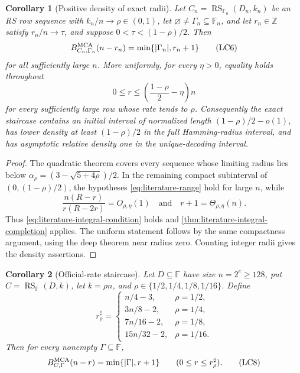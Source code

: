 \documentclass[11pt,a4paper]{amsart}
\numberwithin{equation}{section}
\newtheorem{corollary}[corollary]{Corollary}
\theoremstyle{remark}
\DeclareMathOperator{\RS}{RS}
\newcommand{\F}{\mathbb F}
\newcommand{\Z}{\mathbb Z}
\newcommand{\abs}[1]{\lvert #1\rvert}
\begin{document}
\begin{corollary}[Positive density of exact radii]
\label{cor:positive-radius-density}
Let \(C_n=\RS_{\F_n}(D_n,k_n)\) be an RS row sequence with
\(k_n/n\to\rho\in(0,1)\), let
\(\varnothing\ne\Gamma_n\subseteq\F_n\), and let \(r_n\in\Z\) satisfy
\(r_n/n\to\tau\), and suppose
\(0<\tau<(1-\rho)/2\).  Then
\[
 B_{C_n,\Gamma_n}^{\rm MCA}(n-r_n)
 =\min\{\abs{\Gamma_n},r_n+1\}                   \tag{LC6}
 \label{eq:positive-radius-exact}
\]
for all sufficiently large \(n\).  More uniformly, for every
\(\eta>0\), equality holds throughout
\[
 0\le r\le\left(\frac{1-\rho}{2}-\eta\right)n
\]
for every sufficiently large row whose rate tends to \(\rho\).
Consequently the exact staircase contains an initial interval of
normalized length \((1-\rho)/2-o(1)\), has lower density at least
\((1-\rho)/2\) in the full Hamming-radius interval, and has asymptotic
relative density one in the unique-decoding interval.
\end{corollary}

\begin{proof}
The quadratic theorem covers every sequence whose limiting radius lies
below \(\alpha_\rho=(3-\sqrt{5+4\rho})/2\).  In the remaining compact
subinterval of \((0,(1-\rho)/2)\), the hypotheses
\eqref{eq:literature-range} hold for large \(n\), while
\[
 \frac{n(R-r)}{r(R-2r)}=O_{\rho,\eta}(1)
 \quad\text{and}\quad r+1=\Theta_{\rho,\eta}(n).
\]
Thus \eqref{eq:literature-integral-condition} holds and
\cref{thm:literature-integral-completion} applies.  The uniform statement
follows by the same compactness argument, using the deep theorem near
radius zero.  Counting integer radii gives the density assertions.
\end{proof}

\begin{corollary}[Official-rate staircase]
\label{cor:official-rate-half-staircase}
Let \(D\subseteq\F\) have size \(n=2^e\ge128\), put
\(C=\RS_\F(D,k)\), let \(k=\rho n\), and
\(\rho\in\{1/2,1/4,1/8,1/16\}\).  Define
\[
 r_\rho^\sharp=\begin{cases}
 n/4-3,&\rho=1/2,\\
 3n/8-2,&\rho=1/4,\\
 7n/16-2,&\rho=1/8,\\
 15n/32-2,&\rho=1/16.
 \end{cases}                                      \tag{LC7}
 \label{eq:official-half-endpoints}
\]
Then for every nonempty \(\Gamma\subseteq\F\),
\[
 B_{C,\Gamma}^{\rm MCA}(n-r)=\min\{\abs\Gamma,r+1\}
 \qquad(0\le r\le r_\rho^\sharp).              \tag{LC8}
 \label{eq:official-half-staircase}
\]
\end{corollary}
\end{document}

